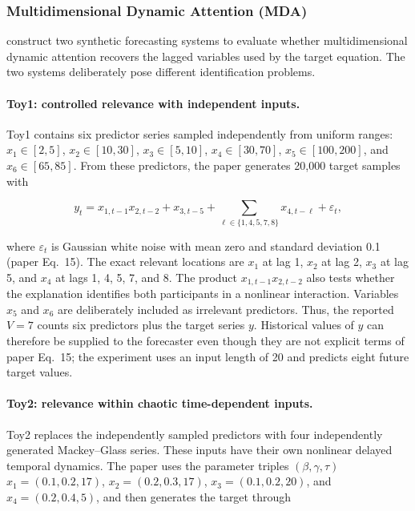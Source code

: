 \subsubsection{Multidimensional Dynamic Attention (MDA)}

\citet{almaghrabi2024multidimensional} construct two synthetic forecasting
systems to evaluate whether multidimensional dynamic attention recovers the
lagged variables used by the target equation. The two systems deliberately
pose different identification problems.

\paragraph{Toy1: controlled relevance with independent inputs.}
Toy1 contains six predictor series sampled independently from uniform ranges:
$x_1\in[2,5]$, $x_2\in[10,30]$, $x_3\in[5,10]$, $x_4\in[30,70]$,
$x_5\in[100,200]$, and $x_6\in[65,85]$. From these predictors, the paper
generates 20,000 target samples with

\begin{equation}
    y_t
    = x_{1,t-1}x_{2,t-2}
    + x_{3,t-5}
    + \sum_{\ell\in\{1,4,5,7,8\}}x_{4,t-\ell}
    + \varepsilon_t,
\end{equation}

where $\varepsilon_t$ is Gaussian white noise with mean zero and standard
deviation 0.1 (paper Eq.~15). The exact relevant locations are $x_1$ at lag 1,
$x_2$ at lag 2, $x_3$ at lag 5, and $x_4$ at lags 1, 4, 5, 7, and 8. The
product $x_{1,t-1}x_{2,t-2}$ also tests whether the explanation identifies both
participants in a nonlinear interaction. Variables $x_5$ and $x_6$ are
deliberately included as irrelevant predictors. Thus, the reported $V=7$
counts six predictors plus the target series $y$. Historical values of $y$ can
therefore be supplied to the forecaster even though they are not explicit terms
of paper Eq.~15; the experiment uses an input length of 20 and predicts eight
future target values.

\paragraph{Toy2: relevance within chaotic time-dependent inputs.}
Toy2 replaces the independently sampled predictors with four independently
generated Mackey--Glass series. These inputs have their own nonlinear delayed
temporal dynamics. The paper uses the parameter triples $(\beta,\gamma,\tau)$
$x_1=(0.1,0.2,17)$, $x_2=(0.2,0.3,17)$, $x_3=(0.1,0.2,20)$, and
$x_4=(0.2,0.4,5)$, and then generates the target through


